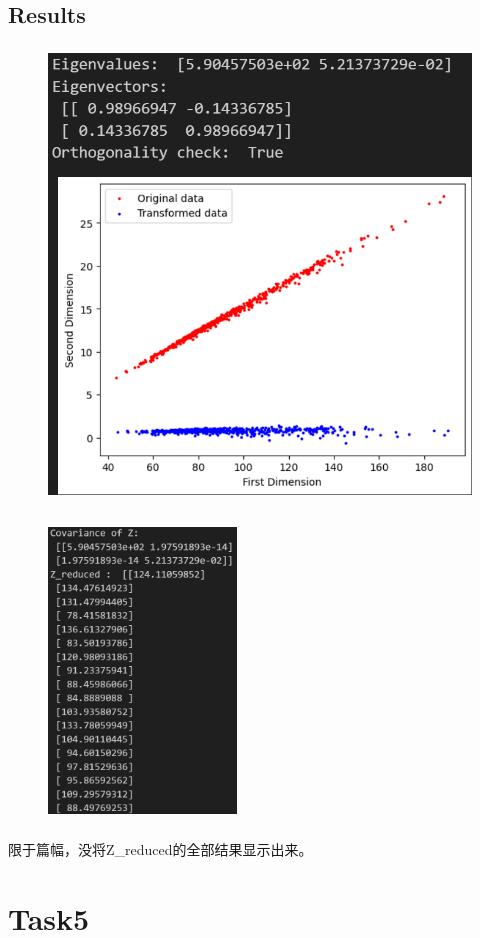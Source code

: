 \documentclass{ctexart}
\begin{document}
	\subsection{Results}
	\begin{figure}[H]
		\centering 
		\includegraphics[height=12cm,width=14cm]{8.png}
		\end{figure}
		\begin{figure}[H]
			\centering 
			\includegraphics[height=8cm,width=5cm]{9.png}
			\end{figure}
		限于篇幅，没将Z\_reduced的全部结果显示出来。
	\section{Task5}
\end{document}
